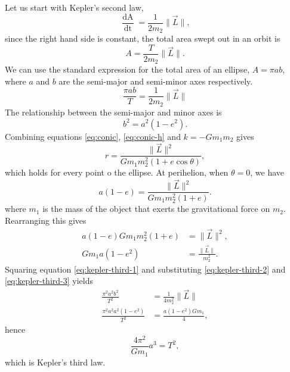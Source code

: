 \begin{enumerate}
    Let us start with Kepler's second law,
    \begin{equation}
        \frac{\mathop{\mathrm{d}A}}{\mathop{\mathrm{d}t}} = \frac{1}{2m_2} \| \vec{L} \|,
    \end{equation}
    since the right hand side is constant, the total area swept out in an orbit is
    \begin{equation}
        A = \frac{T}{2m_2} \| \vec{L} \|.
    \end{equation}
    We can use the standard expression for the total area of an ellipse, $A = \pi ab$, where $a$ and $b$ are the semi-major and semi-minor axes respectively. 
    \begin{equation}
        \label{eq:kepler-third-1}
        \frac{\pi a b }{T} = \frac{1}{2m_2} \| \vec{L} \|
    \end{equation}
    The relationship between the semi-major and minor axes is
    \begin{equation}
        \label{eq:kepler-third-2}
        b^2 = a^2 (1-e^2).
    \end{equation}
    Combining equations \ref{eq:conic}, \ref{eq:conic-h} and $k = -Gm_1m_2$ gives
    \begin{equation}
        r = \frac{\| \vec{L} \|^2}{G m_1 m_2^2 (1 + e\cos \theta)},
    \end{equation}
    which holds for every point o the ellipse. At perihelion, when $\theta = 0$, we have
    \begin{equation}
        a(1 - e) = \frac{\| \vec{L} \|^2}{G m_1 m_2^2 (1 + e)}.
    \end{equation}
    where $m_1$ is the mass of the object that exerts the gravitational force on $m_2$. Rearranging this gives
    \begin{align}
        a(1 - e)G m_1 m_2^2 (1 + e) &= \| \vec{L} \|^2, \\
        G m_1 a (1 - e^2) &= \frac{\| \vec{L} \|}{m_2^2}.
        \label{eq:kepler-third-3}
    \end{align}
    Squaring equation \ref{eq:kepler-third-1} and substituting \ref{eq:kepler-third-2} and \ref{eq:kepler-third-3} yields
    \begin{align}
        \frac{\pi^2 a^2 b^2}{T^2} &= \frac{1}{4m_2^2} \| \vec{L} \| \\
        \frac{\pi^2 a^2 a^2(1-e^2)}{T^2} &= \frac{a(1-e^2)Gm_1}{4},
    \end{align}
    hence
    \begin{equation}
        \frac{4 \pi^2}{Gm_1} a^3 = T^2,
    \end{equation}
    which is Kepler's third law.
\end{enumerate}

